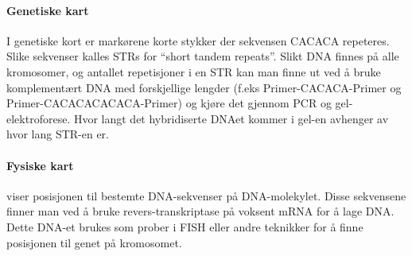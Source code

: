 \paragraph{Genetiske kart} I genetiske kort er markørene korte stykker der sekvensen CACACA repeteres. Slike sekvenser kalles STRs  for ``short tandem repeats''. Slikt DNA finnes på alle kromosomer, og antallet repetisjoner i en STR kan man finne ut ved å bruke komplementært DNA med forskjellige lengder (f.eks Primer-CACACA-Primer og Primer-CACACACACACA-Primer) og kjøre det gjennom PCR og gel-elektroforese. Hvor langt det hybridiserte DNAet kommer i gel-en avhenger av hvor lang STR-en er.

\paragraph{Fysiske kart} viser posisjonen til bestemte DNA-sekvenser på DNA-molekylet. Disse sekvensene finner man ved å bruke revers-transkriptase  på voksent mRNA for å lage DNA. Dette DNA-et brukes som prober i FISH eller andre teknikker for å finne posisjonen til genet på kromosomet.

